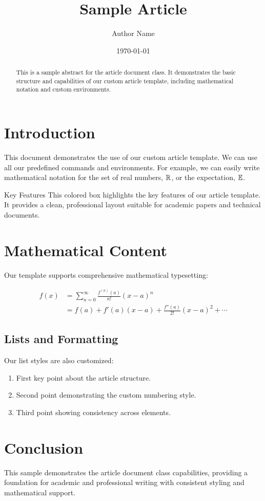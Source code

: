 \documentclass{e_class_article}
\title{Sample Article}
\author{Author Name}
\date{\today}
\begin{document}
\maketitle

\begin{abstract}
    This is a sample abstract for the article document class. It demonstrates the basic structure and capabilities of our custom article template, including mathematical notation and custom environments.
\end{abstract}

\section{Introduction}

This document demonstrates the use of our custom article template. We can use all our predefined commands and environments. For example, we can easily write mathematical notation for the set of real numbers, $\mathbb{R}$, or the expectation, $\mathbb{E}$.

\begin{special_columns}{Key Features}
    This colored box highlights the key features of our article template. It provides a clean, professional layout suitable for academic papers and technical documents.
\end{special_columns}

\section{Mathematical Content}

Our template supports comprehensive mathematical typesetting:

\begin{align}
    f(x) &= \sum_{n=0}^{\infty} \frac{f^{(n)}(a)}{n!}(x-a)^n \\
    &= f(a) + f'(a)(x-a) + \frac{f''(a)}{2!}(x-a)^2 + \cdots
\end{align}

\subsection{Lists and Formatting}

Our list styles are also customized:
\begin{enumerate}
    \item First key point about the article structure.
    \item Second point demonstrating the custom numbering style.
    \item Third point showing consistency across elements.
\end{enumerate}

\section{Conclusion}

This sample demonstrates the article document class capabilities, providing a foundation for academic and professional writing with consistent styling and mathematical support.
\end{document}
